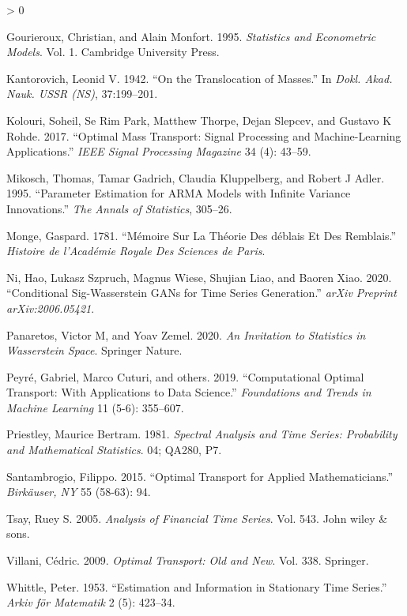 \documentclass[
  11pt,
]{article}
\newlength{\cslhangindent}
\newenvironment{CSLReferences}[2] %
 {%
  \setlength{\parindent}{0pt}
  \ifodd #1 \everypar{\setlength{\hangindent}{\cslhangindent}}\ignorespaces\fi
  \ifnum #2 > 0
  \setlength{\parskip}{#2\baselineskip}
  \fi
 }%
 {}
\begin{document}
\begin{CSLReferences}{1}{0}
\leavevmode\hypertarget{ref-gourieroux1995statistics}{}%
Gourieroux, Christian, and Alain Monfort. 1995. \emph{Statistics and
Econometric Models}. Vol. 1. Cambridge University Press.

\leavevmode\hypertarget{ref-kantorovich1942translocation}{}%
Kantorovich, Leonid V. 1942. {``On the Translocation of Masses.''} In
\emph{Dokl. Akad. Nauk. USSR (NS)}, 37:199--201.

\leavevmode\hypertarget{ref-kolouri2017optimal}{}%
Kolouri, Soheil, Se Rim Park, Matthew Thorpe, Dejan Slepcev, and Gustavo
K Rohde. 2017. {``Optimal Mass Transport: Signal Processing and
Machine-Learning Applications.''} \emph{IEEE Signal Processing Magazine}
34 (4): 43--59.

\leavevmode\hypertarget{ref-mikosch1995parameter}{}%
Mikosch, Thomas, Tamar Gadrich, Claudia Kluppelberg, and Robert J Adler.
1995. {``Parameter Estimation for ARMA Models with Infinite Variance
Innovations.''} \emph{The Annals of Statistics}, 305--26.

\leavevmode\hypertarget{ref-monge1781memoire}{}%
Monge, Gaspard. 1781. {``M{é}moire Sur La Th{é}orie Des d{é}blais Et Des
Remblais.''} \emph{Histoire de l'Acad{é}mie Royale Des Sciences de
Paris}.

\leavevmode\hypertarget{ref-ni2020conditional}{}%
Ni, Hao, Lukasz Szpruch, Magnus Wiese, Shujian Liao, and Baoren Xiao.
2020. {``Conditional Sig-Wasserstein GANs for Time Series Generation.''}
\emph{arXiv Preprint arXiv:2006.05421}.

\leavevmode\hypertarget{ref-panaretos2020invitation}{}%
Panaretos, Victor M, and Yoav Zemel. 2020. \emph{An Invitation to
Statistics in Wasserstein Space}. Springer Nature.

\leavevmode\hypertarget{ref-peyre2019computational}{}%
Peyré, Gabriel, Marco Cuturi, and others. 2019. {``Computational Optimal
Transport: With Applications to Data Science.''} \emph{Foundations and
Trends in Machine Learning} 11 (5-6): 355--607.


\leavevmode\hypertarget{ref-priestley1981spectral}{}%
Priestley, Maurice Bertram. 1981. \emph{Spectral Analysis and Time
Series: Probability and Mathematical Statistics}. 04; QA280, P7.

\leavevmode\hypertarget{ref-santambrogio2015optimal}{}%
Santambrogio, Filippo. 2015. {``Optimal Transport for Applied
Mathematicians.''} \emph{Birk{ä}user, NY} 55 (58-63): 94.

\leavevmode\hypertarget{ref-tsay2005analysis}{}%
Tsay, Ruey S. 2005. \emph{Analysis of Financial Time Series}. Vol. 543.
John wiley \& sons.

\leavevmode\hypertarget{ref-villani2009optimal}{}%
Villani, Cédric. 2009. \emph{Optimal Transport: Old and New}. Vol. 338.
Springer.

\leavevmode\hypertarget{ref-whittle1953estimation}{}%
Whittle, Peter. 1953. {``Estimation and Information in Stationary Time
Series.''} \emph{Arkiv f{ö}r Matematik} 2 (5): 423--34.

\end{CSLReferences}
\end{document}
